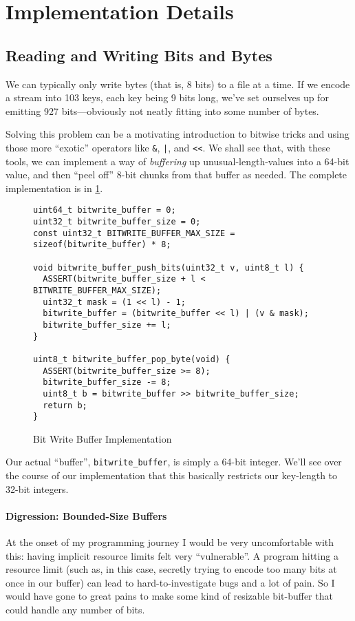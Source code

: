 \documentclass{scrartcl}
\begin{document}
\section{Implementation Details}
\subsection{Reading and Writing Bits and Bytes}
We can typically only write bytes (that is, 8 bits) to a file at a time.
If we encode a stream into 103 keys, each key being 9 bits long, we've set ourselves up for emitting 927 bits---obviously not neatly fitting into some number of bytes.

Solving this problem can be a motivating introduction to bitwise tricks and using those more ``exotic'' operators like \texttt{\&}, \texttt{|}, and \texttt{<<}.
We shall see that, with these tools, we can implement a way of \emph{buffering} up unusual-length-values into a 64-bit value, and then ``peel off'' 8-bit chunks from that buffer as needed.
The complete implementation is in \cref{lst:bitwrite-impl}.

\begin{figure}
\begin{verbatim}
uint64_t bitwrite_buffer = 0;
uint32_t bitwrite_buffer_size = 0;
const uint32_t BITWRITE_BUFFER_MAX_SIZE = sizeof(bitwrite_buffer) * 8;

void bitwrite_buffer_push_bits(uint32_t v, uint8_t l) {
  ASSERT(bitwrite_buffer_size + l < BITWRITE_BUFFER_MAX_SIZE);
  uint32_t mask = (1 << l) - 1;
  bitwrite_buffer = (bitwrite_buffer << l) | (v & mask);
  bitwrite_buffer_size += l;
}

uint8_t bitwrite_buffer_pop_byte(void) {
  ASSERT(bitwrite_buffer_size >= 8);
  bitwrite_buffer_size -= 8;
  uint8_t b = bitwrite_buffer >> bitwrite_buffer_size;
  return b;
}
\end{verbatim}
\caption{Bit Write Buffer Implementation}\label{lst:bitwrite-impl}
\end{figure}

Our actual ``buffer'', \texttt{bitwrite\_buffer}, is simply a 64-bit integer.
We'll see over the course of our implementation that this basically restricts our key-length to 32-bit integers.

\paragraph{Digression: Bounded-Size Buffers}
At the onset of my programming journey I would be very uncomfortable with this: having implicit resource limits felt very ``vulnerable''.
A program hitting a resource limit (such as, in this case, secretly trying to encode too many bits at once in our buffer) can lead to hard-to-investigate bugs and a lot of pain.
So I would have gone to great pains to make some kind of resizable bit-buffer that could handle any number of bits.
\end{document}

